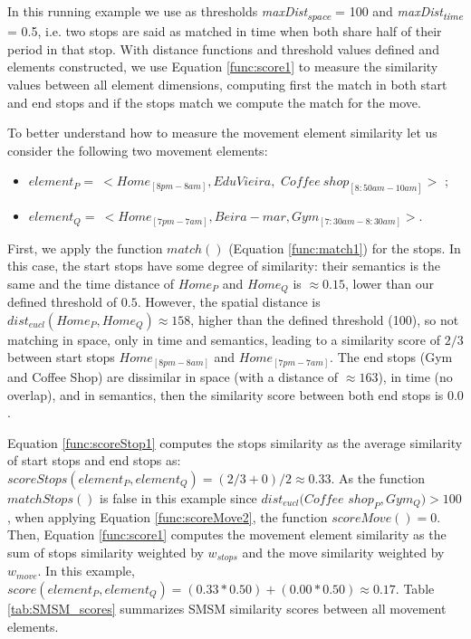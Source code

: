 In this running example we use as thresholds \textit{maxDist\textsubscript{space}} = 100  and \textit{maxDist\textsubscript{time}} = 0.5, i.e. two stops are said as matched in time when both share half of their period in that stop.
With distance functions and threshold values defined and elements constructed, we use Equation \ref{func:score1} to measure the similarity values between all element dimensions, computing first the match in both start and end stops and if the stops match we compute the match for the move. 

To better understand how to measure the movement element similarity let us consider  the following two movement elements: 
\begin{itemize}

\item $element_{P}=\ <Home_{[8pm-8am]}, Edu Vieira,$ $Coffee\ shop_{[8:50am-10am]}>$ ;
\item $element_{Q}=\ <Home_{[7pm-7am]}, Beira-mar, Gym_{[7:30am-8:30am]}>$. 
\end{itemize}
First, we apply the function $match()$ (Equation \ref{func:match1}) for the stops. In this case, the start stops have some degree of similarity: their semantics is the same and the time distance of $Home_{P}$ and $Home_{Q}$ is $\approx 0.15$, lower than our defined threshold of $0.5$. However, the spatial distance is $dist_{eucl}(Home_{P}, Home_{Q}) \approx 158 $, higher than the defined threshold (100), so not matching in space, only in time and semantics, leading to a similarity score of $2/3$ between start stops $Home_{[8pm-8am]}$ and $Home_{[7pm-7am]}$. The end stops (Gym and Coffee Shop) are dissimilar in space (with a distance of $\approx 163$), in time (no overlap), and in semantics, then the similarity score between both end stops is $0.0$.

 Equation \ref{func:scoreStop1} computes the stops similarity as the average similarity of start stops  and end stops as: $scoreStops(element_{P}, element_{Q}) = (2/3 + 0) / 2 \approx 0.33$.
 As the function $matchStops()$ is false in this example since $dist_{eucl}(Coffee$ $shop_{P}, Gym_{Q}) > 100$, when applying Equation \ref{func:scoreMove2}, the function %
$scoreMove()=0$. Then, Equation \ref{func:score1} computes the movement element similarity as the sum of stops similarity weighted by $w_{stops}$ and the move similarity weighted by $w_{move}$. In this example, $score(element_{P}, element_{Q}) = (0.33 * 0.50) + (0.00 * 0.50) \approx 0.17$. Table \ref{tab:SMSM_scores} summarizes SMSM similarity scores between all movement elements.

